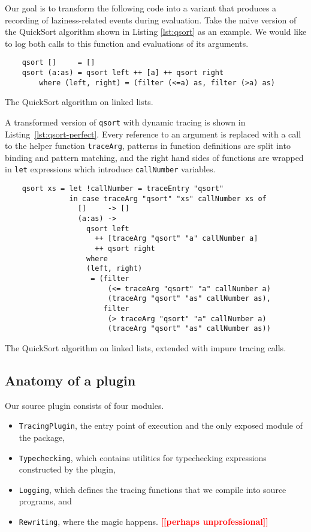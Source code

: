 \documentclass[thesis=B,english]{FITthesis}[2019/12/23]
\newcommand{\todo}[1]{\textcolor{red}{\textbf{[[#1]]}}}
\newcommand{\hsIdent}[1]{\texttt{#1}}
\newcommand{\hsModule}[1]{\texttt{#1}}
\newcommand{\hsCode}[1]{\texttt{#1}}
\begin{document}
Our goal is to transform the following code into a variant that produces a
recording of laziness-related events during evaluation. Take the naive version
of the QuickSort algorithm shown in Listing \ref{lst:qsort} as an example. We
would like to log both calls to this function and evaluations of its arguments.

\begin{listing}[h]
	\centering
	\begin{verbatim}
	qsort []     = []
	qsort (a:as) = qsort left ++ [a] ++ qsort right
	    where (left, right) = (filter (<=a) as, filter (>a) as)
	\end{verbatim}
	\caption{The QuickSort algorithm on linked lists.}
	\label{lst:qsort}
\end{listing}

A transformed version of \hsIdent{qsort} with dynamic tracing is shown in
Listing~\ref{lst:qsort-perfect}. Every reference to an argument is replaced
with a call to the helper function \hsIdent{traceArg}, patterns in function
definitions are split into binding and pattern matching, and the right hand
sides of functions are wrapped in \hsCode{let} expressions which introduce
\hsIdent{callNumber} variables.

\begin{listing}[h]
	\centering
	\begin{verbatim}
	qsort xs = let !callNumber = traceEntry "qsort"
	           in case traceArg "qsort" "xs" callNumber xs of
	             []     -> []
	             (a:as) ->
	               qsort left
	                 ++ [traceArg "qsort" "a" callNumber a]
	                 ++ qsort right
	               where
	               (left, right)
	                = (filter
	                    (<= traceArg "qsort" "a" callNumber a)
	                    (traceArg "qsort" "as" callNumber as),
	                   filter
	                    (> traceArg "qsort" "a" callNumber a)
	                    (traceArg "qsort" "as" callNumber as))
	\end{verbatim}
	\caption[The QuickSort algorithm, rewritten.]{The QuickSort algorithm on
	linked lists, extended with impure tracing calls.}
	\label{lst:qsort-perfect}
\end{listing}

\subsection*{Anatomy of a plugin}
Our source plugin consists of four modules.
\begin{itemize}
	\item \hsModule{TracingPlugin}, the entry point of execution and the only
		exposed module of the package,
	\item \hsModule{Typechecking}, which contains utilities for typechecking
		expressions constructed by the plugin,
	\item \hsModule{Logging}, which defines the tracing functions that we
		compile into source programs, and
	\item \hsModule{Rewriting}, where the magic happens. \todo{perhaps
		unprofessional}
\end{itemize}
\end{document}
